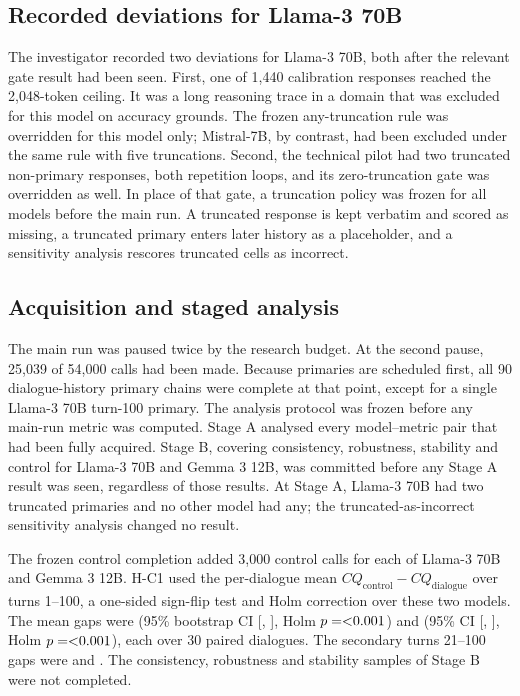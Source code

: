 \documentclass[10pt]{article}
\begin{document}
\subsection{Recorded deviations for Llama-3 70B}
The investigator recorded two deviations for Llama-3 70B, both after the
relevant gate result had been seen. First, one of 1,440 calibration responses
reached the 2,048-token ceiling. It was a long reasoning trace in a domain that
was excluded for this model on accuracy grounds. The frozen any-truncation
rule was overridden for this model only; Mistral-7B, by contrast, had been
excluded under the same rule with five truncations. Second, the technical pilot
had two truncated non-primary responses, both repetition loops, and its
zero-truncation gate was overridden as well. In place of that gate, a
truncation policy was frozen for all models before the main run. A truncated
response is kept verbatim and scored as missing, a truncated primary enters
later history as a placeholder, and a sensitivity analysis rescores truncated
cells as incorrect.

\subsection{Acquisition and staged analysis}
The main run was paused twice by the research budget. At the second pause,
25,039 of 54,000 calls had been made. Because primaries are scheduled first,
all 90 dialogue-history primary chains were complete at that point, except for
a single Llama-3 70B turn-100 primary. The analysis protocol was frozen before
any main-run metric was computed. Stage A analysed every model--metric pair
that had been fully acquired. Stage B, covering consistency, robustness,
stability and control for Llama-3 70B and Gemma 3 12B, was committed before any
Stage A result was seen, regardless of those results. At Stage A, Llama-3 70B
had two truncated primaries and no other model had any; the
truncated-as-incorrect sensitivity analysis changed no result.

The frozen control completion added 3,000 control calls for each of Llama-3
70B and Gemma 3 12B. H-C1 used the per-dialogue mean $CQ_{\text{control}} -
CQ_{\text{dialogue}}$ over turns 1--100, a one-sided sign-flip test and Holm
correction over these two models. The mean gaps were \cdrLlamaControlGap{}
(95\% bootstrap CI [\cdrLlamaControlCiLo{}, \cdrLlamaControlCiHi{}], Holm
$p=\cdrLlamaControlHolmP{}$) and \cdrGemmaControlGap{} (95\% CI
[\cdrGemmaControlCiLo{}, \cdrGemmaControlCiHi{}], Holm
$p=\cdrGemmaControlHolmP{}$), each over 30 paired dialogues. The secondary
turns 21--100 gaps were \cdrLlamaControlLateGap{} and \cdrGemmaControlLateGap{}.
The consistency, robustness and stability samples of Stage B were not
completed.
\end{document}
